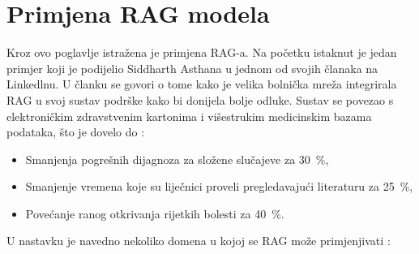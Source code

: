 \documentclass[]{foi}
\begin{document}
\section{Primjena RAG modela}

Kroz ovo poglavlje istražena je primjena RAG-a. Na početku istaknut je jedan primjer koji je podijelio Siddharth Asthana u jednom od svojih
članaka na Linkedlnu. U članku se govori o tome kako je velika bolnička mreža integrirala RAG u svoj sustav podrške kako bi donijela bolje odluke.
Sustav se povezao s elektroničkim zdravstvenim kartonima i višestrukim medicinskim bazama podataka, što je dovelo do \cite{siddharth2025rag}:
\begin{itemize}
    \item Smanjenja pogrešnih dijagnoza za složene slučajeve za 30 \,\%,
    \item Smanjenje vremena koje su liječnici proveli pregledavajući literaturu za 25 \,\%,
    \item Povećanje ranog otkrivanja rijetkih bolesti za 40 \,\%.
\end{itemize}

U nastavku je navedno nekoliko domena u kojoj se RAG može primjenjivati \cite{nishtha2025rag}:
\end{document}

